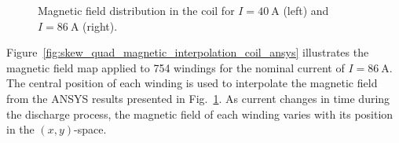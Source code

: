 \begin{figure}[H]
    \centering
    \caption{Magnetic field distribution in the coil for $I=40~\text{A}$ (left) and $I=86~\text{A}$ (right).}
    \label{fig:skew_quad_magnetic_results_coil_ansys}
\end{figure}

Figure~\ref{fig:skew_quad_magnetic_interpolation_coil_ansys} illustrates the magnetic field map applied to 754 windings for the nominal current of $I=86~\text{A}$. The central position of each winding is used to interpolate the magnetic field from the ANSYS results presented in Fig.~\ref{fig:skew_quad_magnetic_results_coil_ansys}. As current changes in time during the discharge process, the magnetic field of each winding varies with its position in the $(x,y)$-space.

